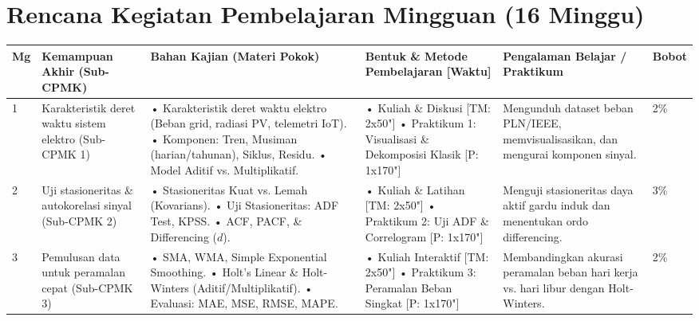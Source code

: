 \documentclass[9.5pt,a4paper]{article}
\begin{document}
\newpage

\section{Rencana Kegiatan Pembelajaran Mingguan (16 Minggu)}

\begin{longtable}{|C{0.6cm}|L{3.2cm}|L{4.5cm}|L{3.8cm}|L{3.8cm}|C{0.8cm}|}
\hline
{}
\color{white}\textbf{Mg} & \color{white}\textbf{Kemampuan Akhir (Sub-CPMK)} & \color{white}\textbf{Bahan Kajian (Materi Pokok)} & \color{white}\textbf{Bentuk \& Metode Pembelajaran [Waktu]} & \color{white}\textbf{Pengalaman Belajar / Praktikum} & \color{white}\textbf{Bobot} \\ \hline
\endhead

1 & Karakteristik deret waktu sistem elektro (Sub-CPMK 1) & 
• Karakteristik deret waktu elektro (Beban grid, radiasi PV, telemetri IoT).\newline
• Komponen: Tren, Musiman (harian/tahunan), Siklus, Residu.\newline
• Model Aditif vs. Multiplikatif. & 
• Kuliah \& Diskusi [TM: 2x50"]\newline
• Praktikum 1: Visualisasi \& Dekomposisi Klasik [P: 1x170"] & 
Mengunduh dataset beban PLN/IEEE, memvisualisasikan, dan mengurai komponen sinyal. & 2\% \\ \hline

2 & Uji stasioneritas \& autokorelasi sinyal (Sub-CPMK 2) & 
• Stasioneritas Kuat vs. Lemah (Kovarians).\newline
• Uji Stasioneritas: ADF Test, KPSS.\newline
• ACF, PACF, \& Differencing ($d$). & 
• Kuliah \& Latihan [TM: 2x50"]\newline
• Praktikum 2: Uji ADF \& Correlogram [P: 1x170"] & 
Menguji stasioneritas daya aktif gardu induk dan menentukan ordo differencing. & 3\% \\ \hline

3 & Pemulusan data untuk peramalan cepat (Sub-CPMK 3) & 
• SMA, WMA, Simple Exponential Smoothing.\newline
• Holt’s Linear \& Holt-Winters (Aditif/Multiplikatif).\newline
• Evaluasi: MAE, MSE, RMSE, MAPE. & 
• Kuliah Interaktif [TM: 2x50"]\newline
• Praktikum 3: Peramalan Beban Singkat [P: 1x170"] & 
Membandingkan akurasi peramalan beban hari kerja vs. hari libur dengan Holt-Winters. & 2\% \\ \hline


\end{longtable}
\end{document}
